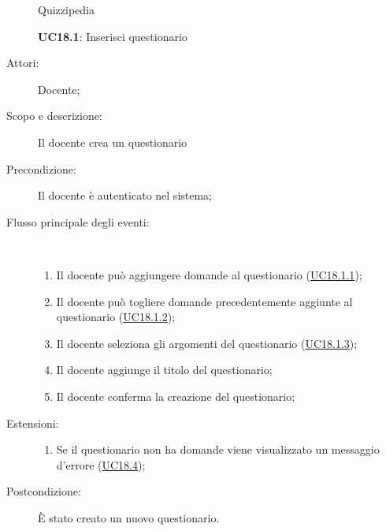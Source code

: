\begin{figure}[H]
	\centering
	\begin{resizedtikzpicture}{\textwidth}
		\begin{umlsystem}[x=0, fill=lightgray!20]{Quizzipedia}
		\end{umlsystem}
	\end{resizedtikzpicture}
	\caption{\textbf{UC18.1}: Inserisci questionario}
	\label{UC18.1}
\end{figure}
\begin{description}
	\item[Attori:] Docente;
	\item[Scopo e descrizione:] Il docente crea un questionario
	\item[Precondizione:] Il docente è autenticato nel sistema;
	
	\item[Flusso principale degli eventi:] \ 
	\begin{enumerate}
		\item Il docente può aggiungere domande al questionario (\hyperlink{UC18.1.1}{UC18.1.1});
		\item Il docente può togliere domande precedentemente aggiunte al questionario (\hyperlink{UC18.1.2}{UC18.1.2});
		\item Il docente seleziona gli argomenti del questionario (\hyperlink{UC18.1.3}{UC18.1.3});
		\item Il docente aggiunge il titolo del questionario;
		\item Il docente conferma la creazione del questionario;
		
	\end{enumerate}
	\item[Estensioni:]
	\begin{enumerate}
		\item Se il questionario non ha domande viene visualizzato un messaggio d'errore (\hyperlink{UC18.4}{UC18.4});
		
	\end{enumerate}
	\item[Postcondizione:] È stato creato un nuovo questionario.
\end{description}
\hypertarget{UC18.1.1}{}
